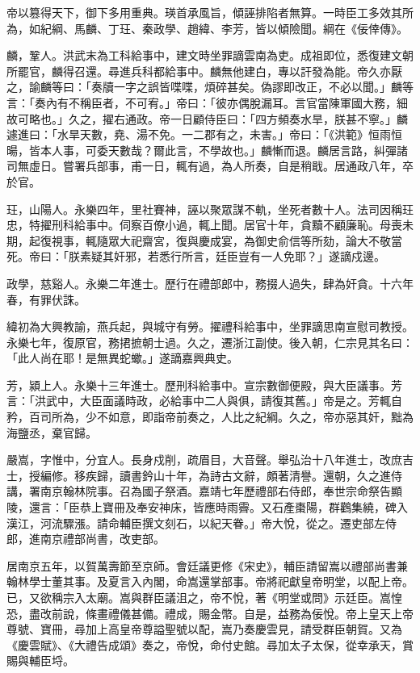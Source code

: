 \begin{pinyinscope}
帝以篡得天下，御下多用重典。瑛首承風旨，傾誣排陷者無算。一時臣工多效其所為，如紀綱、馬麟、丁玨、秦政學、趙緯、李芳，皆以傾險聞。綱在《佞倖傳》。

麟，鞏人。洪武末為工科給事中，建文時坐罪謫雲南為吏。成祖即位，悉復建文朝所罷官，麟得召還。尋進兵科都給事中。麟無他建白，專以訐發為能。帝久亦厭之，諭麟等曰：「奏牘一字之誤皆喋喋，煩碎甚矣。偽謬即改正，不必以聞。」麟等言：「奏內有不稱臣者，不可宥。」帝曰：「彼亦偶脫漏耳。言官當陳軍國大務，細故可略也。」久之，擢右通政。帝一日顧侍臣曰：「四方頻奏水旱，朕甚不寧。」麟遽進曰：「水旱天數，堯、湯不免。一二郡有之，未害。」帝曰：「《洪範》恒雨恒暘，皆本人事，可委天數哉？爾此言，不學故也。」麟慚而退。麟居言路，糾彈諸司無虛日。嘗署兵部事，甫一日，輒有過，為人所奏，自是稍戢。居通政八年，卒於官。

玨，山陽人。永樂四年，里社賽神，誣以聚眾謀不軌，坐死者數十人。法司因稱玨忠，特擢刑科給事中。伺察百僚小過，輒上聞。居官十年，貪黷不顧廉恥。母喪未期，起復視事，輒隨眾大祀齋宮，復與慶成宴，為御史俞信等所劾，論大不敬當死。帝曰：「朕素疑其奸邪，若悉行所言，廷臣豈有一人免耶？」遂謫戍邊。

政學，慈谿人。永樂二年進士。歷行在禮部郎中，務掇人過失，肆為奸貪。十六年春，有罪伏誅。

緯初為大興教諭，燕兵起，與城守有勞。擢禮科給事中，坐罪謫思南宣慰司教授。永樂七年，復原官，務捃摭朝士過。久之，遷浙江副使。後入朝，仁宗見其名曰：「此人尚在耶！是無異蛇蠍。」遂謫嘉興典史。

芳，潁上人。永樂十三年進士。歷刑科給事中。宣宗數御便殿，與大臣議事。芳言：「洪武中，大臣面議時政，必給事中二人與俱，請復其舊。」帝是之。芳輒自矜，百司所為，少不如意，即詣帝前奏之，人比之紀綱。久之，帝亦惡其奸，黜為海鹽丞，棄官歸。

嚴嵩，字惟中，分宜人。長身戍削，疏眉目，大音聲。舉弘治十八年進士，改庶吉士，授編修。移疾歸，讀書鈐山十年，為詩古文辭，頗著清譽。還朝，久之進侍講，署南京翰林院事。召為國子祭酒。嘉靖七年歷禮部右侍郎，奉世宗命祭告顯陵，還言：「臣恭上寶冊及奉安神床，皆應時雨霽。又石產棗陽，群鸛集繞，碑入漢江，河流驟漲。請命輔臣撰文刻石，以紀天眷。」帝大悅，從之。遷吏部左侍郎，進南京禮部尚書，改吏部。

居南京五年，以賀萬壽節至京師。會廷議更修《宋史》，輔臣請留嵩以禮部尚書兼翰林學士董其事。及夏言入內閣，命嵩還掌部事。帝將祀獻皇帝明堂，以配上帝。已，又欲稱宗入太廟。嵩與群臣議沮之，帝不悅，著《明堂或問》示廷臣。嵩惶恐，盡改前說，條畫禮儀甚備。禮成，賜金幣。自是，益務為佞悅。帝上皇天上帝尊號、寶冊，尋加上高皇帝尊謚聖號以配，嵩乃奏慶雲見，請受群臣朝賀。又為《慶雲賦》、《大禮告成頌》奏之，帝悅，命付史館。尋加太子太保，從幸承天，賞賜與輔臣埒。


\end{pinyinscope}
